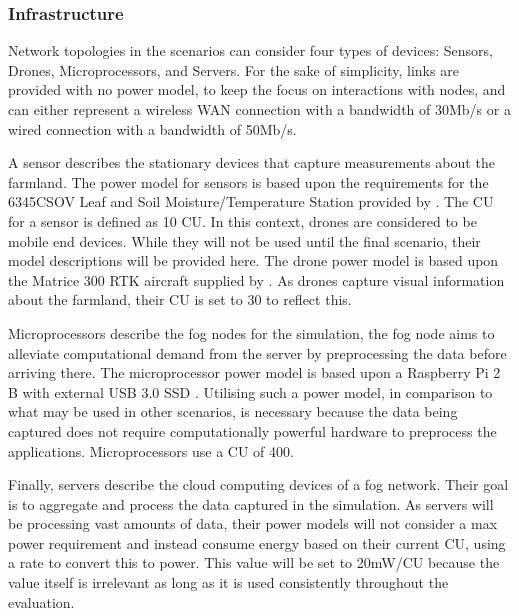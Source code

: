 \documentclass{l4proj}
\begin{document}
\subsubsection{Infrastructure}
Network topologies in the scenarios can consider four types of devices: Sensors, Drones, Microprocessors, and Servers.
For the sake of simplicity, links are provided with no power model, to keep the focus on interactions with nodes, and can either represent a wireless WAN connection with a bandwidth of 30Mb/s or a wired connection with a bandwidth of 50Mb/s.

A sensor describes the stationary devices that capture measurements about the farmland.
The power model for sensors is based upon the requirements for the 6345CSOV Leaf and Soil Moisture/Temperature Station provided by \cite{prodataWeatherSystems}.
The CU for a sensor is defined as 10 CU.
In this context, drones are considered to be mobile end devices. While they will not be used until the final scenario, their model descriptions will be provided here.
The drone power model is based upon the Matrice 300 RTK aircraft supplied by \cite{drone_spec}.
As drones capture visual information about the farmland, their CU is set to 30 to reflect this.

Microprocessors describe the fog nodes for the simulation, the fog node aims to alleviate computational demand from the server by preprocessing the data before arriving there.
The microprocessor power model is based upon a Raspberry Pi 2 B with external USB 3.0 SSD \citep{pidramble}.
Utilising such a power model, in comparison to what may be used in other scenarios, is necessary because the data being captured does not require computationally powerful hardware to preprocess the applications.
Microprocessors use a CU of 400.

Finally, servers describe the cloud computing devices of a fog network. Their goal is to aggregate and process the data captured in the simulation.
As servers will be processing vast amounts of data, their power models will not consider a max power requirement and instead consume energy based on their current CU, using a rate to convert this to power.
This value will be set to 20mW/CU because the value itself is irrelevant as long as it is used consistently throughout the evaluation.
\end{document}
